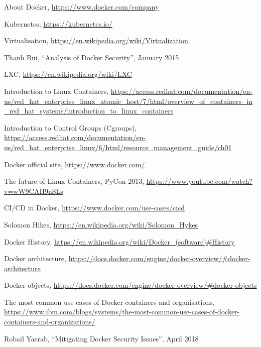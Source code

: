 \documentclass[a4paper,12pt]{article}
\begin{document}
\begin{thebibliography}{99}

About Docker, \url{https://www.docker.com/company}

Kubernetes, \url{https://kubernetes.io/}

Virtualisation,
\url{https://en.wikipedia.org/wiki/Virtualization}

Thanh Bui, ``Analysis of Docker Security'', January 2015

LXC, \url{https://en.wikipedia.org/wiki/LXC}

Introduction to Linux Containers, \url{https://access.redhat.com/documentation/en-us/red_hat_enterprise_linux_atomic_host/7/html/overview_of_containers_in_red_hat_systems/introduction_to_linux_containers}
  
Introduction to Control Groups (Cgroups),
\url{https://access.redhat.com/documentation/en-us/red_hat_enterprise_linux/6/html/resource_management_guide/ch01}

Docker official site, \url{https://www.docker.com/}

The future of Linux Containers, PyCon 2013,
\url{https://www.youtube.com/watch?v=wW9CAH9nSLs}

CI/CD in Docker, \url{https://www.docker.com/use-cases/cicd}

Solomon Hikes,
\url{https://en.wikipedia.org/wiki/Solomon_Hykes}

Docker History,
\url{https://en.wikipedia.org/wiki/Docker_(software)#History}

Docker architecture,
\url{https://docs.docker.com/engine/docker-overview/#docker-architecture}

Docker objects,
\url{https://docs.docker.com/engine/docker-overview/#docker-objects}

The most common use cases of Docker containers and organisations,
\url{https://www.ibm.com/blogs/systems/the-most-common-use-cases-of-docker-containers-and-organizations/}

Robail Yasrab, ``Mitigating Docker Security Issues'', April 2018


\end{thebibliography}
\end{document}
